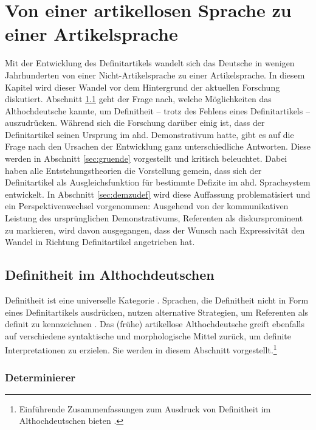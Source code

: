 \chapter{Von einer artikellosen Sprache zu einer Artikelsprache}\label{forschung}


Mit der Entwicklung des Definitartikels wandelt sich das Deutsche in wenigen Jahrhunderten von einer Nicht-Artikelsprache zu einer Artikelsprache. 
In diesem Kapitel wird dieser Wandel vor dem Hintergrund der aktuellen Forschung diskutiert. Abschnitt \ref{sec:def-ahd} geht der Frage nach, welche Möglichkeiten das Althochdeutsche kannte, um Definitheit -- trotz des Fehlens eines Definitartikels -- auszudrücken. Während sich die Forschung darüber einig ist, dass der Definitartikel seinen Ursprung im ahd. Demonstrativum  hatte,
gibt es auf die Frage nach den Ursachen der Entwicklung ganz unterschiedliche Antworten. Diese werden in Abschnitt \ref{sec:gruende} vorgestellt und kritisch beleuchtet. Dabei haben alle Entstehungstheorien die Vorstellung gemein, dass sich der Definitartikel als Ausgleichsfunktion für bestimmte Defizite im ahd. Sprachsystem entwickelt. In Abschnitt \ref{sec:demzudef} wird diese Auffassung problematisiert und ein Perspektivenwechsel vorgenommen: Ausgehend von der kommunikativen Leistung des ursprünglichen Demonstrativums, Referenten als diskursprominent zu markieren, wird davon ausgegangen, dass der Wunsch nach Expressivität den Wandel in Richtung Definitartikel angetrieben hat.

\section{Definitheit im Althochdeutschen} \label{sec:def-ahd}

Definitheit ist eine universelle Kategorie \parencite[269]{Leiss2000}. Sprachen, die Definitheit nicht in Form eines Definitartikels ausdrücken, nutzen alternative Strategien, um Referenten als definit zu kennzeichnen \parencite[für einen typologischen Überblick s.][]{Kramsky1972}. Das (frühe) artikellose Althochdeutsche greift ebenfalls auf verschiedene syntaktische und morphologische Mittel zurück, um definite Interpretationen zu erzielen. Sie werden in diesem Abschnitt vorgestellt.\footnote{Einführende Zusammenfassungen zum Ausdruck von Definitheit im Althochdeutschen bieten \textcite{Szczepaniak2011a,Ferraresi2014,Szczepaniak2015}.}

\subsection{Determinierer}\label{determinierer}

